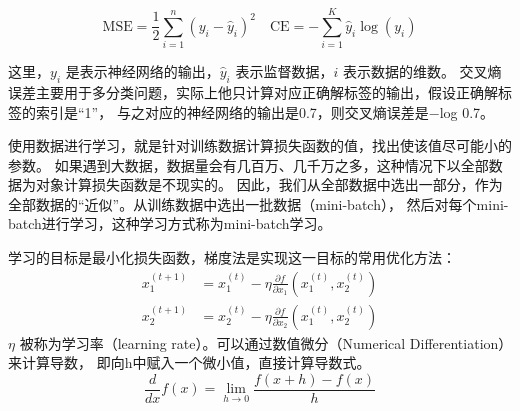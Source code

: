 \begin{equation*}
	\text{MSE}  = \frac{1}{2} \sum_{i=1}^n (y_i - \hat{y}_i)^2 \quad
	\text{CE}   = - \sum_{i=1}^K \hat{y}_i \log(y_i)
\end{equation*}

这里，$y_i$ 是表示神经网络的输出，$\hat{y}_i$ 表示监督数据，$i$ 表示数据的维数。
交叉熵误差主要用于多分类问题，实际上他只计算对应正确解标签的输出，假设正确解标签的索引是“1”，
与之对应的神经网络的输出是0.7，则交叉熵误差是−log 0.7。

使用数据进行学习，就是针对训练数据计算损失函数的值，找出使该值尽可能小的参数。
如果遇到大数据，数据量会有几百万、几千万之多，这种情况下以全部数据为对象计算损失函数是不现实的。
因此，我们从全部数据中选出一部分，作为全部数据的“近似”。从训练数据中选出一批数据（mini-batch），
然后对每个mini-batch进行学习，这种学习方式称为mini-batch学习。

学习的目标是最小化损失函数，梯度法是实现这一目标的常用优化方法：
\begin{align*}
	x_1^{(t+1)} & = x_1^{(t)} - \eta \frac{\partial f}{\partial x_1}(x_1^{(t)}, x_2^{(t)}) \\
	x_2^{(t+1)} & = x_2^{(t)} - \eta \frac{\partial f}{\partial x_2}(x_1^{(t)}, x_2^{(t)})
\end{align*}
$\eta$ 被称为学习率（learning rate）。可以通过数值微分（Numerical Differentiation）来计算导数，
即向h中赋入一个微小值，直接计算导数式。
\begin{equation*}
	\frac{d}{dx} f(x) = \lim_{h \to 0} \frac{f(x + h) - f(x)}{h}
\end{equation*}